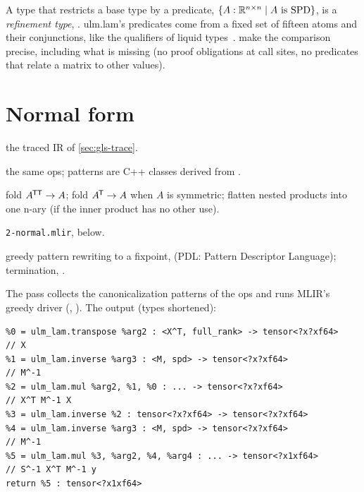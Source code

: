 \begin{theory}[ (\FGs{1.7})]
A type that restricts a base type by a predicate,
\(\{A : \mathbb{R}^{n\times n} \mid A \text{ is SPD}\}\), is a \emph{refinement
type}, . ulm.lam's predicates come from a fixed
set of fifteen atoms and their conjunctions, like the qualifiers of liquid
types~\cite{liquid,refinement}.  make the comparison precise, including
what is missing (no proof obligations at call sites, no predicates that
relate a matrix to other values).
\end{theory}

\section{Normal form}
\label{sec:gls-normal}

\begin{steps}
\item[Input] the traced IR of \cref{sec:gls-trace}.
\item[Representation] the same ops; patterns are C++ classes derived from .
\item[Rule] fold \(A^{\mkern-1.5mu\mathsf{T}}{}^{\mkern-1.5mu\mathsf{T}} \to A\); fold \(A^{\mkern-1.5mu\mathsf{T}} \to A\) when \(A\) is symmetric; flatten nested products into one n-ary  (if the inner product has no other use).
\item[Output] \texttt{2-normal.mlir}, below.
\item[Theory] greedy pattern rewriting to a fixpoint,  (PDL: Pattern Descriptor Language); termination, .
\end{steps}

The pass  collects the canonicalization patterns of
the ops and runs MLIR's greedy driver (,
). The output (types shortened):

\begin{lstlisting}
%0 = ulm_lam.transpose %arg2 : <X^T, full_rank> -> tensor<?x?xf64>             // X
%1 = ulm_lam.inverse %arg3 : <M, spd> -> tensor<?x?xf64>                       // M^-1
%2 = ulm_lam.mul %arg2, %1, %0 : ... -> tensor<?x?xf64>                       // X^T M^-1 X
%3 = ulm_lam.inverse %2 : tensor<?x?xf64> -> tensor<?x?xf64>
%4 = ulm_lam.inverse %arg3 : <M, spd> -> tensor<?x?xf64>                       // M^-1
%5 = ulm_lam.mul %3, %arg2, %4, %arg4 : ... -> tensor<?x1xf64>                // S^-1 X^T M^-1 y
return %5 : tensor<?x1xf64>
\end{lstlisting}


